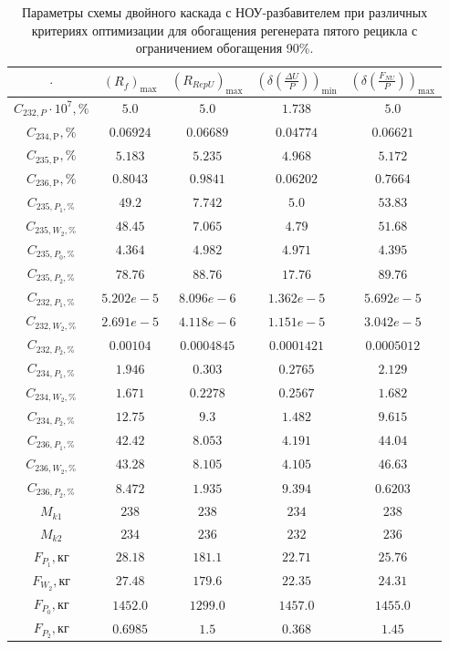 \begin{table}
    \begin{tabular}{ccccc}
    $\cdot$ & $(R_f)_\text{max}$ & $(R_{RepU})_\text{max}$ & $(\delta(\frac{\Delta U}{P}))_\text{min}$ & $(\delta(\frac{F_{NU}}{P}))_\text{max}$\\ \hline
    $C_{232,P}\cdot10^{7}, \%$ & $5.0$ & $5.0$ & $1.738$ & $5.0$\\ \hline
    $C_{234,\text{P}}, \%$ & $0.06924$ & $0.06689$ & $0.04774$ & $0.06621$\\ \hline
    $C_{235,\text{P}}, \%$ & $5.183$ & $5.235$ & $4.968$ & $5.172$\\ \hline
    $C_{236,\text{P}}, \%$ & $0.8043$ & $0.9841$ & $0.06202$ & $0.7664$\\ \hline
    $C_{235,P_1, \%}$      & $49.2$ & $7.742$ & $5.0$ & $53.83$\\ \hline
    $C_{235,W_2, \%}$      & $48.45$ & $7.065$ & $4.79$ & $51.68$\\ \hline
    $C_{235,P_0, \%}$      & $4.364$ & $4.982$ & $4.971$ & $4.395$\\ \hline
    $C_{235,P_2, \%}$      & $78.76$ & $88.76$ & $17.76$ & $89.76$\\ \hline
    $C_{232,P_1, \%}$      & $5.202e-5$ & $8.096e-6$ & $1.362e-5$ & $5.692e-5$\\ \hline
    $C_{232,W_2, \%}$      & $2.691e-5$ & $4.118e-6$ & $1.151e-5$ & $3.042e-5$\\ \hline
    $C_{232,P_2, \%}$      & $0.00104$ & $0.0004845$ & $0.0001421$ & $0.0005012$\\ \hline
    $C_{234,P_1, \%}$      & $1.946$ & $0.303$ & $0.2765$ & $2.129$\\ \hline
    $C_{234,W_2, \%}$      & $1.671$ & $0.2278$ & $0.2567$ & $1.682$\\ \hline
    $C_{234,P_2, \%}$      & $12.75$ & $9.3$ & $1.482$ & $9.615$\\ \hline
    $C_{236,P_1, \%}$      & $42.42$ & $8.053$ & $4.191$ & $44.04$\\ \hline
    $C_{236,W_2, \%}$      & $43.28$ & $8.105$ & $4.105$ & $46.63$\\ \hline
    $C_{236,P_2, \%}$      & $8.472$ & $1.935$ & $9.394$ & $0.6203$\\ \hline
    $M_{k1}$               & $238$ & $238$ & $234$ & $238$\\ \hline
    $M_{k2}$               & $234$ & $236$ & $232$ & $236$\\ \hline
    $F_{P_1}, \text{кг}$   & $28.18$ & $181.1$ & $22.71$ & $25.76$\\ \hline
    $F_{W_2}, \text{кг}$   & $27.48$ & $179.6$ & $22.35$ & $24.31$\\ \hline
    $F_{P_0}, \text{кг}$   & $1452.0$ & $1299.0$ & $1457.0$ & $1455.0$\\ \hline
    $F_{P_2}, \text{кг}$   & $0.6985$ & $1.5$ & $0.368$ & $1.45$\\ \hline
    \end{tabular}
\caption{Параметры схемы двойного каскада с НОУ-разбавителем при различных критериях оптимизации для обогащения регенерата пятого рецикла с ограничением обогащения 90\%.{\label{2opt5_90}}}
\end{table}


